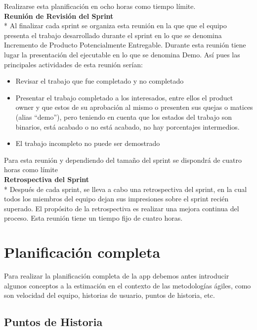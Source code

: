\documentclass[../pfc.tex]{subfiles}
\begin{document}
	Realizarse esta planificación en ocho horas como tiempo límite.\\
	
	\textbf{Reunión de Revisión del Sprint}\\*
	Al finalizar cada sprint se organiza esta reunión en la que que el equipo presenta el trabajo desarrollado durante el sprint en lo que se denomina Incremento de Producto Potencialmente Entregable. Durante esta reunión tiene lugar la presentación del ejecutable en lo que se denomina Demo. Así pues las principales actividades de esta reunión serían:
	\begin{itemize} 
		\item Revisar el trabajo que fue completado y no completado 
		\item 	Presentar el trabajo completado a los interesados, entre ellos el product owner y que estos de su aprobación al mismo o presenten sus quejas o matices (alias “demo”), pero teniendo en cuenta que los estados del trabajo son binarios, está acabado o no está acabado, no hay porcentajes intermedios. 
		\item El trabajo incompleto no puede ser demostrado 
	\end{itemize}
	
	Para esta reunión y dependiendo del tamaño del sprint se dispondrá de cuatro horas como límite\\
	
	\textbf{Retrospectiva del Sprint }\\*
	Después de cada sprint, se lleva a cabo una retrospectiva del sprint, en la cual todos los miembros del equipo dejan sus impresiones sobre el sprint recién superado. El propósito de la retrospectiva es realizar una mejora continua del proceso. Esta reunión tiene un tiempo fijo de cuatro horas.
	
	\section{Planificación completa}
	
	Para realizar la planificación completa de la app debemos antes introducir algunos conceptos a la estimación en el contexto de las metodologías ágiles, como son velocidad del equipo, historias de usuario, puntos de historia, etc.    
	
	\subsection{Puntos de Historia}
	
\end{document}
